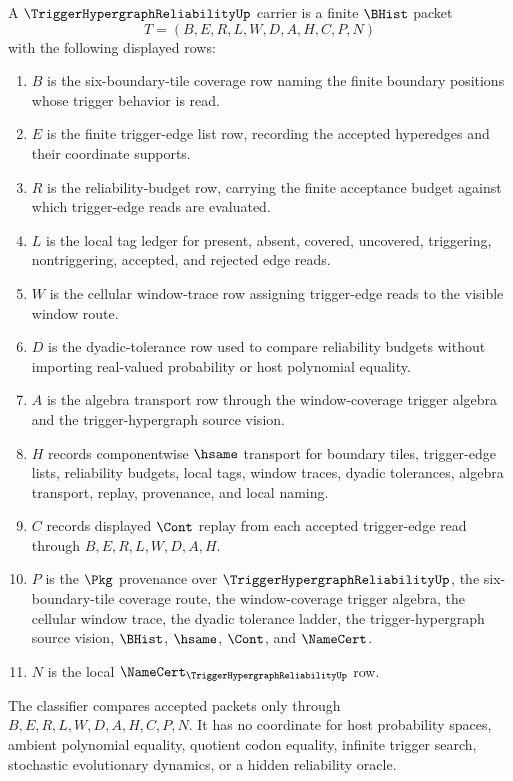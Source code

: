 \begin{definition}
\label{def:trigger-hypergraph-reliability-carrier}
A $\TriggerHypergraphReliabilityUp$ carrier is a finite $\BHist$ packet
$$
T=(B,E,R,L,W,D,A,H,C,P,N)
$$
with the following displayed rows:
\begin{enumerate}
\item $B$ is the six-boundary-tile coverage row naming the finite boundary positions whose trigger behavior is read.
\item $E$ is the finite trigger-edge list row, recording the accepted hyperedges and their coordinate supports.
\item $R$ is the reliability-budget row, carrying the finite acceptance budget against which trigger-edge reads are evaluated.
\item $L$ is the local tag ledger for present, absent, covered, uncovered, triggering, nontriggering, accepted, and rejected edge reads.
\item $W$ is the cellular window-trace row assigning trigger-edge reads to the visible window route.
\item $D$ is the dyadic-tolerance row used to compare reliability budgets without importing real-valued probability or host polynomial equality.
\item $A$ is the algebra transport row through the window-coverage trigger algebra and the trigger-hypergraph source vision.
\item $H$ records componentwise $\hsame$ transport for boundary tiles, trigger-edge lists, reliability budgets, local tags, window traces, dyadic tolerances, algebra transport, replay, provenance, and local naming.
\item $C$ records displayed $\Cont$ replay from each accepted trigger-edge read through $B,E,R,L,W,D,A,H$.
\item $P$ is the $\Pkg$ provenance over $\TriggerHypergraphReliabilityUp$, the six-boundary-tile coverage route, the window-coverage trigger algebra, the cellular window trace, the dyadic tolerance ladder, the trigger-hypergraph source vision, $\BHist$, $\hsame$, $\Cont$, and $\NameCert$.
\item $N$ is the local $\NameCert_{\TriggerHypergraphReliabilityUp}$ row.
\end{enumerate}
The classifier compares accepted packets only through $B,E,R,L,W,D,A,H,C,P,N$. It has no coordinate for host probability spaces, ambient polynomial equality, quotient codon equality, infinite trigger search, stochastic evolutionary dynamics, or a hidden reliability oracle.
\end{definition}

